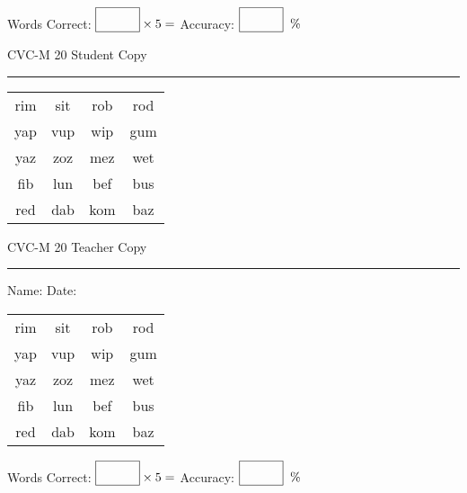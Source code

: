 \documentclass{memoir}
\begin{document}
\small

Words Correct: $\fbox{\phantom{\huge 100}} \times 5 = $ Accuracy: $\fbox{\phantom{\huge 100}}\;\; \%$ 

\vfill

\newpage



\footnotesize \noindent
CVC-M 20 \hfill Student Copy
\smallskip
\hrule

\Large

\setlength{\tabcolsep}{14pt}
\def\arraystretch{2}

{\selectfont


\begin{vplace}[0.5]
\begin{center}
\begin{tabular}{cccc}
rim & sit & rob & rod \\
yap & vup & wip & gum  \\
yaz & zoz & mez & wet \\
fib & lun & bef & bus \\
red & dab & kom & baz \\
\end{tabular}
\end{center}
\end{vplace}

}

\newpage

\footnotesize \noindent
CVC-M 20 \hfill Teacher Copy
\smallskip
\hrule

\small

\vfill

\noindent
Name: \underline{\hspace{1.75in}} \hfill Date: \underline{\hspace{1in}}

\Large

{\selectfont


\begin{vplace}[0.5]
\begin{center}
\begin{tabular}{cccc}
rim & sit & rob & rod \\
yap & vup & wip & gum  \\
yaz & zoz & mez & wet \\
fib & lun & bef & bus \\
red & dab & kom & baz \\
\end{tabular}
\end{center}
\end{vplace}



}

\small

Words Correct: $\fbox{\phantom{\huge 100}} \times 5 = $ Accuracy: $\fbox{\phantom{\huge 100}}\;\; \%$ 

\vfill

\end{document}
